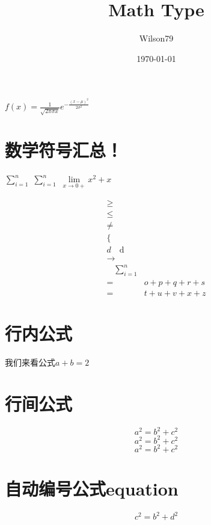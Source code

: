 \documentclass{article}
\title{Math Type}
\author{Wilson79}
\date{\today}
\begin{document}
 
    \tableofcontents %
    \maketitle %
    
    $f(x)=\frac{1}{\sqrt{2 \pi \sigma x}} e^{-\frac{(x-\mu)^{2}}{2 \sigma^{2}}}$

\section{数学符号汇总！}
    
    $\sum _{i=1}^{n}$ %
    $\sum \limits_{i=1}^{n}$
    $\lim\limits _{x \rightarrow 0+} x^2 + x$ 

    \[
    \begin{aligned} 
        \geq \\ %
        \leq \\ %
        \neq \\ %
        \{  \\  %
        d \quad \mathrm{d} \\ %
        \rightarrow \\ %
        \quad %
        \sum\limits_{i=1}^{n} \\ %
        =& o+p+q+r+s \\ 
        =& t+u+v+x+z 
    \end{aligned}
    \]
    

    

\section{行内公式} %
    我们来看公式$a+b=2$ %

\section{行间公式}
    \[a^2 = b ^2 + c^2 \] %
    $$a^2 = b ^2 + c^2$$
    \begin{displaymath}
    a^2 = b ^2 + c^2
    \end{displaymath}

\section{自动编号公式equation}
    \begin{equation} %
     c^2 = b ^2 + d^2 
    \end{equation}
\end{document}
